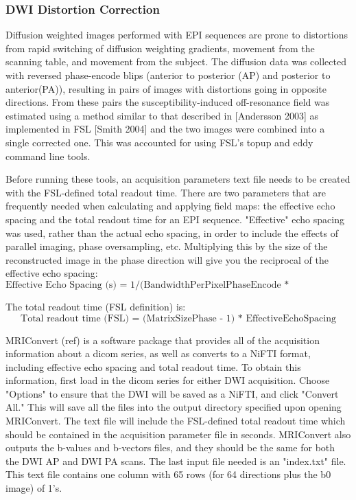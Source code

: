 \subsubsection{DWI Distortion Correction}

Diffusion weighted images performed with EPI sequences are prone to distortions from rapid switching of diffusion weighting gradients, movement from the scanning table, and movement from the subject. The diffusion data was collected with reversed phase-encode blips (anterior to posterior (AP) and posterior to anterior(PA)), resulting in pairs of images with distortions going in opposite directions. From these pairs the susceptibility-induced off-resonance field was estimated using a method similar to that described in [Andersson 2003] as implemented in FSL [Smith 2004] and the two images were combined into a single corrected one. This was accounted for using FSL's topup and eddy command line tools.

Before running these tools, an acquisition parameters text file needs to be created with the FSL-defined total readout time. There are two parameters that are frequently needed when calculating and applying field maps: the effective echo spacing and the total readout time for an EPI sequence. "Effective" echo spacing was used, rather than the actual echo spacing, in order to include the effects of parallel imaging, phase oversampling, etc. Multiplying this by the size of the reconstructed image in the phase direction will give you the reciprocal of the effective echo spacing:
\[
\text{Effective Echo Spacing (s) = 1/(BandwidthPerPixelPhaseEncode * MatrixSizePhase)}
\]

The total readout time (FSL definition) is:
\[
\text{Total readout time (FSL) = (MatrixSizePhase - 1) * EffectiveEchoSpacing}
\]

MRIConvert (ref) is a software package that provides all of the acquisition information about a dicom series, as well as converts to a NiFTI format, including effective echo spacing and total readout time. To obtain this information, first load in the dicom series for either DWI acquisition. Choose "Options" to ensure that the DWI will be saved as a NiFTI, and click "Convert All." This will save all the files into the output directory specified upon opening MRIConvert. The text file will include the FSL-defined total readout time which should be contained in the acquisition parameter file in seconds. MRIConvert also outputs the b-values and b-vectors files, and they should be the same for both the DWI AP and DWI PA scans. The last input file needed is an "index.txt" file. This text file contains one column with 65 rows (for 64 directions plus the b0 image) of 1's.

